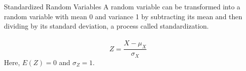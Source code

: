 \documentclass{./../div_teaching_slides}
\begin{document}
\begin{frame}{Standardized Random Variables}
A random variable can be transformed into a random variable with mean 0 and variance 1 by subtracting its mean and then dividing by its standard deviation, a process called standardization. \\~\\
$$ Z = \frac{X-\mu_X}{\sigma_X} $$
Here, $E(Z) = 0$ and $\sigma_Z = 1$.
\end{frame}

%
%
%
\end{document}

